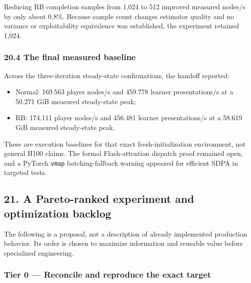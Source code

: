 \documentclass[
  10pt,
  letterpaper,
]{article}
\providecommand{\tightlist}{%
  \setlength{\itemsep}{0pt}\setlength{\parskip}{0pt}}
\begin{document}
Reducing RB completion samples from 1,024 to 512 improved measured
nodes/s by only about 0.8\%. Because sample count changes estimator
quality and no variance or exploitability equivalence was established,
the experiment retained 1,024.

\subsubsection{20.4 The final measured
baseline}\label{204-the-final-measured-baseline}

Across the three-iteration steady-state confirmations, the handoff
reported:

\begin{itemize}
\tightlist
\item
  Normal: 169.563 player nodes/s and 459.778 learner presentations/s at
  a 50.271 GiB measured steady-state peak;
\item
  RB: 174.111 player nodes/s and 456.481 learner presentations/s at a
  58.619 GiB measured steady-state peak.
\end{itemize}

These are execution baselines for that exact fresh-initialization
environment, not general H100 claims. The formal Flash-attention
dispatch proof remained open, and a PyTorch \texttt{vmap}
batching-fallback warning appeared for efficient SDPA in targeted tests.

\subsection{21. A Pareto-ranked experiment and optimization
backlog}\label{21-a-pareto-ranked-experiment-and-optimization-backlog}

The following is a proposal, not a description of already implemented
production behavior. Its order is chosen to maximize information and
reusable value before specialized engineering.

\subsubsection{Tier 0 --- Reconcile and reproduce the exact
target}\label{tier-0--reconcile-and-reproduce-the-exact-target}
\end{document}

